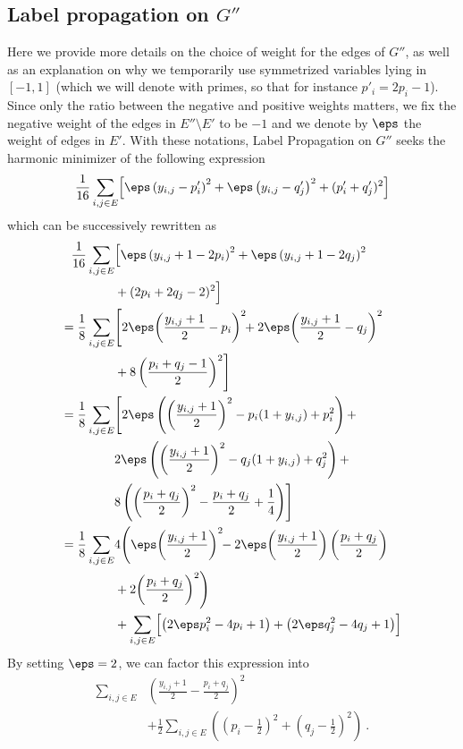 \subsection{Label propagation on $G''$}
%
Here we provide more details on the choice of weight for the edges of $G''$, as
well as an explanation on why we temporarily use symmetrized variables lying in
$[-1, 1]$ (which we will denote with primes, so that for instance $p'_i =
2p_i-1$). Since only the ratio between the negative and positive weights
matters, we fix the negative weight of the edges in $E''\setminus E'$ to be
$-1$ and we denote by $\eps$ the weight of edges in $E'$.  With these notations,
Label Propagation on $G''$ seeks the harmonic minimizer of the following
expression 
\begin{equation*}
  \frac{1}{16} \sum_{i,j \in E} \Bigl[ \eps\left(y_{i,j} - p_i'\right)^2 + \eps\left(y_{i,j} - q_j'\right)^2 + (p'_i+q_j')^2 \Bigr] \\
\end{equation*}
which can be successively rewritten as
\begin{align*}
  \frac{1}{16} \sum_{i,j \in E} & \Bigl[ \eps\left(y_{i,j}+1 - 2p_i\right)^2 + \eps\left(y_{i,j}+1 - 2q_j\right)^2
\\&
	+ (2p_i +2q_j -2)^2 \Bigr]
\\=
	\frac{1}{8} \sum_{i,j \in E} & \Biggl[ 2\eps\!\left(\frac{y_{i,j}+1}{2} - p_i\right)^2\!\! +  2\eps\!\left(\frac{y_{i,j}+1}{2} - q_j\right)^2
\\&
	+ 8\left(\frac{p_i +q_j -1}{2}\right)^2 \Biggr]
\\=
  \frac{1}{8}\sum_{i,j \in E} & \Biggl[ 2\eps\left(\left(\frac{y_{i,j}+1}{2}\right)^2 - p_i(1+y_{i,j}) + p_i^2\right) + \\
                              & 2\eps\left(\left(\frac{y_{i,j}+1}{2}\right)^2 - q_j(1+y_{i,j}) + q_j^2\right) +  \\
                              & 8\left(\left(\frac{p_i +q_j}{2}\right)^2 - \frac{p_i+q_j}{2} + \frac{1}{4} \right) \Biggr]
\\=
  \frac{1}{8}\sum_{i,j \in E} & 4\Biggl(\eps\!\left(\frac{y_{i,j}+1}{2}\right)^2\!\! -
  2\eps\!\left(\frac{y_{i,j}+1}{2}\right)\left(\frac{p_i+q_j}{2}\right)
\\&
  + 2\!\left(\frac{p_i +q_j}{2}\right)^2\Biggr)
\\&+
  \sum_{i,j \in E} \Bigl[ \left(2\eps p_i^2 - 4p_i + 1\right) + \left(2\eps q_j^2 - 4q_j + 1\right) \Bigr]
\end{align*}
%
By setting $\eps=2$, we can factor this expression into 
\begin{align*}
  \sum_{i,j \in E} &\left(\frac{y_{i,j}+1}{2} - \frac{p_i+q_j}{2}\right)^2
\\&
  + \frac{1}{2}\sum_{i,j \in E} \left(\left(p_i - \frac{1}{2}\right )^2 + \left(q_j - \frac{1}{2}\right)^2 \right)~.
\end{align*}

